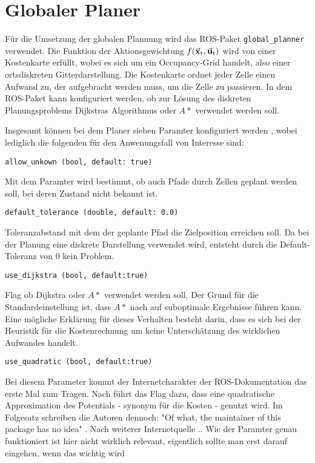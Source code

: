 \section{Globaler Planer}
Für die Umsetzung der globalen Plannung wird das ROS-Paket \lstinline{global_planner} \cite{WikiGlobalPlanner} verwendet. Die Funktion der Aktionsgewichtung $f(\vec{\mathbf{x}}_{\text{t}}, \vec{\mathbf{u}}_{\text{t}})$ wird von einer Kostenkarte erfüllt, wobei es sich um ein Occupancy-Grid handelt, also einer ortsdiskreten Gitterdarstellung. Die Kostenkarte ordnet jeder Zelle einen Aufwand zu, der aufgebracht werden muss, um die Zelle zu passieren. In dem ROS-Paket kann konfiguriert werden, ob zur Lösung des diskreten Planungsproblems Dijkstras Algorithmus oder $A*$ verwendet werden soll. 

Insgesamt können bei dem Planer sieben Paramter konfiguriert werden \cite{global_planner}, wobei lediglich die folgenden für den Anwenungsfall von Interesse sind:
\newline

\lstinline{allow_unkown (bool, default: true)}{}

Mit dem Paramter wird bestimmt, ob auch Pfade durch Zellen geplant werden soll, bei deren Zustand nicht bekannt ist.
\newline

\lstinline{default_tolerance (double, default: 0.0)}{}

Toleranzabstand mit dem der geplante Pfad die Zielposition erreichen soll. Da bei der Planung eine diskrete Darstellung verwendet wird, entsteht durch die Default-Toleranz von 0 kein Problem.
\newline

\lstinline{use_dijkstra (bool, default:true)}{}

Flag ob Dijkstra oder $A*$ verwendet werden soll. Der Grund für die Standardeinstellung ist, dass $A*$ nach \cite{WikiGlobalPlanner} auf suboptimale Ergebnisse führen kann. Eine mögliche Erklärung für dieses Verhalten besteht darin, dass es sich bei der Heuristik für die Kostenrechnung um keine Unterschätzung des wirklichen Aufwandes handelt.
\newline

\lstinline{use_quadratic (bool, default:true)}{}

Bei diesem Parameter kommt der Internetcharakter der ROS-Dokumentation das erste Mal zum Tragen. Nach \cite{WikiGlobalPlanner} führt das Flag dazu, dass eine quadratische Approximation des Potentials - synonym für die Kosten - genutzt wird. Im Folgesatz schreiben die Autoren dennoch: "Of what, the maintainer of this package has no idea" \cite{WikiGlobalPlanner}. Nach weiterer Internetquelle .. {\color{red} Wie der Paramter genau funktioniert ist hier nicht wirklich relevant, eigentlich sollte man erst darauf eingehen, wenn das wichtig wird}
\newline

